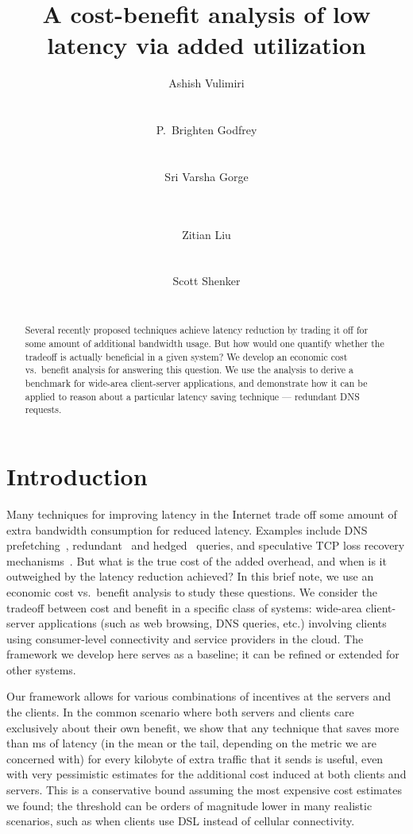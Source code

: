 \documentclass{sigcomm-alternate}
\title{A cost-benefit analysis of low latency via added utilization}
\author{
\alignauthor
Ashish Vulimiri\\
\affaddr{UIUC}\\
\email{vulimir1@illinois.edu}\\
\alignauthor
P.\ Brighten Godfrey\\
\affaddr{UIUC}\\
\email{pbg@illinois.edu}\\
\alignauthor
Sri Varsha Gorge\\
\affaddr{Salesforce}\\
\email{gorge.srivarsha@gmail.com}\\
\and  \alignauthor
Zitian Liu\\
\affaddr{Microsoft}\\
\email{liu236@illinois.edu}\\
\alignauthor
Scott Shenker\\
\affaddr{UC Berkeley and ICSI}\\
\email{shenker@icsi.berkeley.edu}
}
\date{}
\begin{document}
\maketitle

\begin{abstract}
Several recently proposed techniques achieve latency reduction by trading it off for some amount of additional bandwidth usage.  But how would one quantify whether the tradeoff is actually beneficial in a given system?  We develop an economic cost vs.\ benefit analysis for answering this question.  We use the analysis to derive a benchmark for wide-area client-server applications, and demonstrate how it can be applied to reason about a particular latency saving technique --- redundant DNS requests.
\end{abstract}

\section{Introduction}

Many techniques for improving latency in the Internet trade off some amount of extra bandwidth consumption for reduced latency.  Examples include DNS prefetching~\cite{ChromiumPrefetching}, redundant~\cite{Vulimiri2012,Vulimiri2013} and hedged~\cite{Dean2013} queries, and speculative TCP loss recovery mechanisms~\cite{Flach2013}.  But what is the true cost of the added overhead, and when is it outweighed by the latency reduction achieved?  In this brief note, we use an economic cost vs.\ benefit analysis to study these questions.  We consider the tradeoff between cost and benefit in a specific class of systems: wide-area client-server applications (such as web browsing, DNS queries, etc.) involving clients using consumer-level connectivity and service providers in the cloud.  The framework we develop here serves as a baseline; it can be refined or extended for other systems.

Our framework allows for various combinations of incentives at the servers and the clients.  In the common scenario where both servers and clients care exclusively about their own benefit, we show that any technique that saves more than  ms of latency (in the mean or the tail, depending on the metric we are concerned with) for every kilobyte of extra traffic that it sends is useful, even with very pessimistic estimates for the additional cost induced at both clients and servers.  This is a conservative bound assuming the most expensive cost estimates we found; the threshold can be orders of magnitude lower in many realistic scenarios, such as when clients use DSL instead of cellular connectivity.
\end{document}
